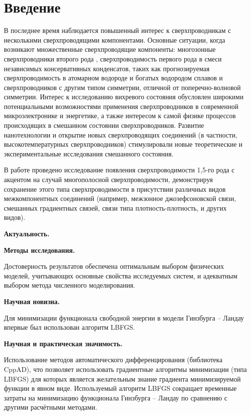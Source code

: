 \chapter*{Введение}

В последнее время наблюдается повышенный интерес к сверхпроводникам с 
несколькими сверхпроводящими компонентами. Основные ситуации, когда возникают 
множественные сверхпроводящие компоненты: многозонные сверхпроводники второго 
рода \cite{bib:6,bib:7,bib:8,bib:9,bib:10,bib:11}, сверхпроводимость первого 
рода в смеси независимых консервативных конденсатов, таких как прогнозируемая 
сверхпроводимость в атомарном водороде и богатых водородом сплавов 
\cite{bib:12.1,bib:12.2,bib:13,bib:14} и сверхпроводников с другим типом 
симметрии, отличной от поперечно-волновой симметрии. Интерес к исследованию 
вихревого состояния обусловлен широкими потенциальными возможностями 
применения сверхпроводников в современной микроэлектронике и энергетике, а 
также интересом к самой физике процессов происходящих в смешанном состоянии 
сверхпроводников. Развитие нанотехнологии и открытие новых сверхпроводящих 
соединений (в частности, высокотемпературных сверхпроводников) стимулировали 
новые теоретические и экспериментальные исследования смешанного состояния. 

В работе проведено исследование появления сверхпроводимости 1,5-го рода с 
акцентом на случай многополосной сверхпроводимости, демонстрируя сохранение 
этого типа сверхпроводимости в присутствии различных видов межкомпонентных 
соединений (например, межзонное джозефсоновской связи, смешанных градиентных 
связей, связи типа плотность-плотность, и других видов).

\textbf{Актуальность.} %

\textbf{Методы исследования.}

Достоверность результатов обеспечена оптимальным выбором физических моделей, 
учитывающих основные свойства исследуемых систем, и адекватным выбором метода 
численного моделирования.

\textbf{Научная новизна.}

Для минимизации функционала свободной энергии в модели Гинзбурга -- Ландау 
впервые был использован алгоритм LBFGS.

\textbf{Научная и практическая значимость.}

Использование методов автоматического дифференцирования (библиотека CppAD), 
что позволяет использовать градиентные алгоритмы минимизации (типа LBFGS) для 
которых является желательным знание градиента минимизируемой функции в явном 
виде. Используемый алгоритм LBFGS сокращает временные затраты на минимизацию 
функционала Гинзбурга -- Ландау по сравнению с другими расчётными методами.

\newpage